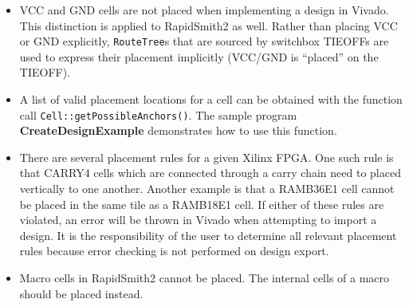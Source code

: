 \begin {itemize}
  \item VCC and GND cells are not placed when implementing a design in Vivado.
  This distinction is applied to RapidSmith2 as well. Rather than placing VCC
  or GND explicitly, \texttt{RouteTree}s that are sourced by switchbox TIEOFFs
  are used to express their placement implicitly (VCC/GND is ``placed'' on the
  TIEOFF).
  
  \item A list of valid placement locations for a cell can be obtained with the
  function call \texttt{Cell::get\-Possible\-Anchors()}. The sample program
  \textbf{CreateDesignExample} demonstrates how to use this function.
 
  \item There are several placement rules for a given Xilinx FPGA. One such
  rule is that CARRY4 cells which are connected through a carry chain need
  to placed vertically to one another. Another example is that a RAMB36E1
  cell cannot be placed in the same tile as a RAMB18E1 cell. If either of these
  rules are violated, an error will be thrown in Vivado when attempting to
  import a design. It is the responsibility of the user to determine all
  relevant placement rules because error checking is not performed on design
  export.
  
  \item Macro cells in RapidSmith2 cannot be placed. The internal cells of a
  macro should be placed instead.
\end{itemize}
